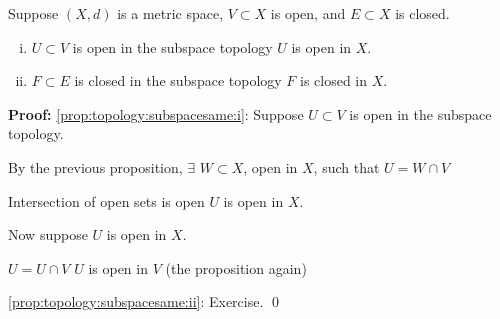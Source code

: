 \documentclass[10pt,aspectratio=149]{beamer}
\begin{document}
\begin{frame}

\begin{proposition}
Suppose $(X,d)$ is a metric space, $V \subset X$ is open,
and $E \subset X$ is closed.
\begin{enumerate}[(i)]
\item
\pause
\label{prop:topology:subspacesame:i}
$U \subset V$ is open in the subspace topology \wiffif $U$ is open
in $X$.
\item
\pause
\label{prop:topology:subspacesame:ii}
$F \subset E$ is closed in the subspace topology \wiffif $F$ is
closed in $X$.
\end{enumerate}
\end{proposition}

\pause

\textbf{Proof:}
\eqref{prop:topology:subspacesame:i}:
Suppose $U \subset V$ is open in the subspace topology.

\pause
\medskip

By the previous proposition, $\exists$ $W \subset X$,
open in $X$, such that $U = W \cap V$

\pause
\medskip

Intersection of open sets is open \wthus $U$ is open in $X$.

\pause
\medskip

Now suppose $U$ is open in $X$.

\pause
\medskip

\thus \quad $U = U \cap V$ \wthus
$U$ is open in $V$ (the proposition again)

\pause
\medskip

\eqref{prop:topology:subspacesame:ii}: Exercise.
\qed

\end{frame}
\end{document}
